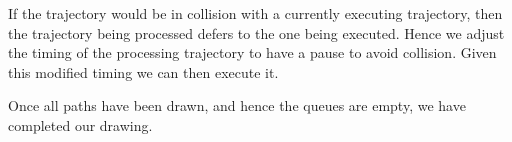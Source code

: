 If the trajectory would be in collision with a currently executing trajectory, then the trajectory being processed defers to the one being executed. 
Hence we adjust the timing of the processing trajectory to have a pause to avoid collision. Given this modified timing we can then execute it. 

Once all paths have been drawn, and hence the queues are empty, we have completed our drawing. 

